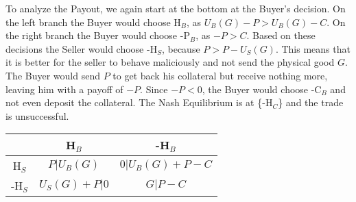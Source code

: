 \documentclass{cacthesis}
\begin{document}
\newline
To analyze the Payout, we again start at the bottom at the Buyer's decision. On the left branch the Buyer would choose H$_B$, as $U_B(G) - P > U_B(G) - C$.\newline
On the right branch the Buyer would choose -P$_B$, as $-P > C$.\newline
Based on these decisions the Seller would choose -H$_S$, because $P > P - U_S(G)$.\newline
This means that it is better for the seller to behave maliciously and not send the physical good $G$. The Buyer would send $P$ to get back his collateral but receive nothing more, leaving him with a payoff of $-P$. \newline
Since $-P < 0$, the Buyer would choose -C$_B$ and not even deposit the collateral.\newline
The Nash Equilibrium is at \{-H$_C$\} and the trade is unsuccessful.


\begin{center}
\begin{tabular}{ c||c|c| }
& H$_B$ & -H$_B$   \\
\hline
\hline
H$_S$ & $P | U_B(G)$ & $0 | U_B(G) + P - C$  \\
\hline
-H$_S$ & $U_S(G) + P | 0$ & $G | P - C$  \\ 
\hline
\end{tabular}
\end{center}
\end{document}
